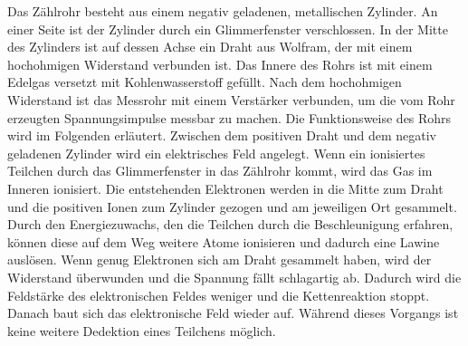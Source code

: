 Das Zählrohr besteht aus einem negativ geladenen, metallischen Zylinder. An einer Seite 
ist der Zylinder durch ein Glimmerfenster verschlossen. In der Mitte des Zylinders ist
auf dessen Achse ein Draht aus Wolfram, der mit einem hochohmigen Widerstand verbunden ist. 
Das Innere des Rohrs ist mit einem Edelgas versetzt mit Kohlenwasserstoff gefüllt. 
Nach dem hochohmigen Widerstand ist das Messrohr mit einem Verstärker verbunden, um die 
vom Rohr erzeugten Spannungsimpulse messbar zu machen. 
Die Funktionsweise des Rohrs wird im Folgenden erläutert. 
Zwischen dem positiven Draht und dem negativ geladenen Zylinder wird ein elektrisches 
Feld angelegt. Wenn ein ionisiertes Teilchen durch das Glimmerfenster in das Zählrohr 
kommt, wird das Gas im Inneren ionisiert. Die entstehenden Elektronen werden 
in die Mitte zum Draht und die positiven Ionen zum Zylinder gezogen und am jeweiligen 
Ort gesammelt. Durch den Energiezuwachs, den die Teilchen durch die Beschleunigung 
erfahren, können diese auf dem Weg weitere Atome ionisieren und dadurch eine Lawine
auslösen. Wenn genug Elektronen sich am Draht gesammelt haben, wird der Widerstand überwunden
und die Spannung fällt schlagartig ab. Dadurch wird die Feldstärke des elektronischen Feldes 
weniger und die Kettenreaktion stoppt. Danach baut sich das elektronische Feld wieder auf. 
Während dieses Vorgangs ist keine weitere Dedektion eines Teilchens möglich. 
 
